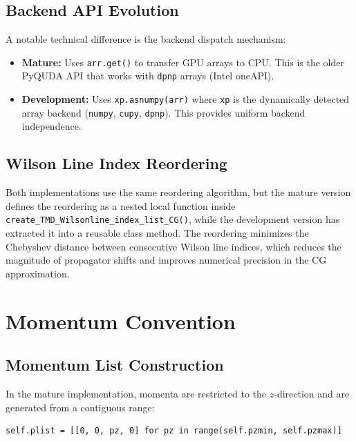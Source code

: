 \documentclass[11pt]{article}
\begin{document}
\subsection{Backend API Evolution}

A notable technical difference is the backend dispatch mechanism:

\begin{itemize}
    \item \textbf{Mature:} Uses \texttt{arr.get()} to transfer GPU arrays to CPU. This is the older PyQUDA API that works with \texttt{dpnp} arrays (Intel oneAPI).
    \item \textbf{Development:} Uses \texttt{xp.asnumpy(arr)} where \texttt{xp} is the dynamically detected array backend (\texttt{numpy}, \texttt{cupy}, \texttt{dpnp}). This provides uniform backend independence.
\end{itemize}

\subsection{Wilson Line Index Reordering}

Both implementations use the same reordering algorithm, but the mature version defines the reordering as a nested local function inside \texttt{create\_TMD\_Wilsonline\_index\_list\_CG()}, while the development version has extracted it into a reusable class method. The reordering minimizes the Chebyshev distance between consecutive Wilson line indices, which reduces the magnitude of propagator shifts and improves numerical precision in the CG approximation.

\section{Momentum Convention}
\label{sec:momentum}

\subsection{Momentum List Construction}

In the mature implementation, momenta are restricted to the $z$-direction and are generated from a contiguous range:

\begin{lstlisting}
self.plist = [[0, 0, pz, 0] for pz in range(self.pzmin, self.pzmax)]
\end{lstlisting}
\end{document}
